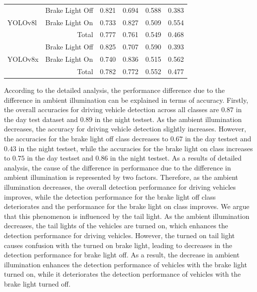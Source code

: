 \begin{table}[!b]
\begin{tabular}{llcccc}
    \midrule
    \multirow{3}{*}{YOLOv8l}                   & Brake Light Off                            & 0.821          & 0.694                     & 0.588          & 0.383                     \\
                                           & Brake Light On                             & 0.733                   & 0.827            & 0.509                   & 0.554            \\
                                           & \multicolumn{1}{r}{Total}                  & 0.777          & 0.761                     & 0.549          & 0.468                    \\
    \midrule
    \multirow{3}{*}{YOLOv8x}                   & Brake Light Off                            & 0.825          & 0.707                     & 0.590          & 0.393                     \\
                                           & Brake Light On                             & 0.740                   & 0.836            & 0.515                   & 0.562            \\
                                           & \multicolumn{1}{r}{Total}                  & 0.782          & 0.772                     & 0.552          & 0.477                    \\
    \bottomrule
    \end{tabular}%
\end{table}



According to the detailed analysis, the performance difference due to the difference in ambient illumination can be explained in terms of accuracy.
Firstly, the overall accuracies for driving vehicle detection across all classes are $0.87$ in the day test dataset and $0.89$ in the night testset.
As the ambient illumination decreases, the accuracy for driving vehicle detection slightly increases.
However, the accuracies for the brake light off class decreases to $0.67$ in the day testset and $0.43$ in the night testset, while the accuracies for the brake light on class increases to $0.75$ in the day testset and $0.86$ in the night testset.
As a results of detailed analysis, the cause of the difference in performance due to the difference in ambient illumination is represented by two factors.
Therefore, as the ambient illumination decreases, the overall detection performance for driving vehicles improves, while the detection performance for the brake light off class deteriorates and the performance for the brake light on class improves.
We argue that this phenomenon is influenced by the tail light.
As the ambient illumination decreases, the tail lights of the vehicles are turned on, which enhances the detection performance for driving vehicles.
However, the turned on tail light causes confusion with the turned on brake light, leading to decreases in the detection performance for brake light off.
As a result, the decrease in ambient illumination enhances the detection performance of vehicles with the brake light turned on, while it deteriorates the detection performance of vehicles with the brake light turned off.


